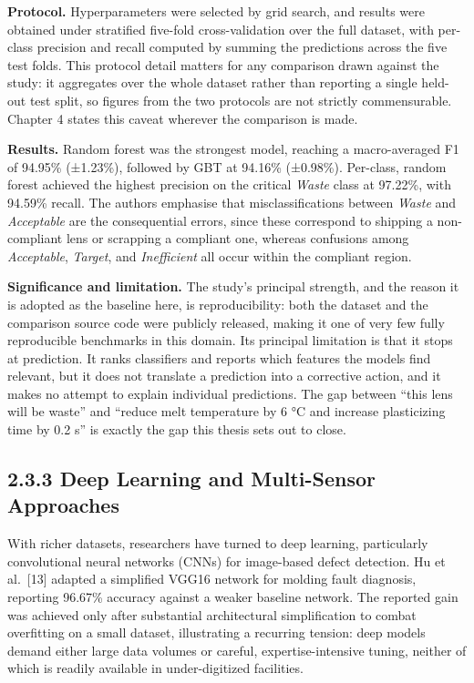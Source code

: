 \textbf{Protocol.} Hyperparameters were selected by grid search, and results were obtained under stratified five-fold cross-validation over the full dataset, with per-class precision and recall computed by summing the predictions across the five test folds. This protocol detail matters for any comparison drawn against the study: it aggregates over the whole dataset rather than reporting a single held-out test split, so figures from the two protocols are not strictly commensurable. Chapter 4 states this caveat wherever the comparison is made.

\textbf{Results.} Random forest was the strongest model, reaching a macro-averaged F1 of 94.95\% (±1.23\%), followed by GBT at 94.16\% (±0.98\%). Per-class, random forest achieved the highest precision on the critical \emph{Waste} class at 97.22\%, with 94.59\% recall. The authors emphasise that misclassifications between \emph{Waste} and \emph{Acceptable} are the consequential errors, since these correspond to shipping a non-compliant lens or scrapping a compliant one, whereas confusions among \emph{Acceptable}, \emph{Target}, and \emph{Inefficient} all occur within the compliant region.

\textbf{Significance and limitation.} The study's principal strength, and the reason it is adopted as the baseline here, is reproducibility: both the dataset and the comparison source code were publicly released, making it one of very few fully reproducible benchmarks in this domain. Its principal limitation is that it stops at prediction. It ranks classifiers and reports which features the models find relevant, but it does not translate a prediction into a corrective action, and it makes no attempt to explain individual predictions. The gap between ``this lens will be waste'' and ``reduce melt temperature by 6 °C and increase plasticizing time by 0.2 s'' is exactly the gap this thesis sets out to close.

\hypertarget{deep-learning-and-multi-sensor-approaches}{%
\subsection{2.3.3 Deep Learning and Multi-Sensor Approaches}\label{deep-learning-and-multi-sensor-approaches}}

With richer datasets, researchers have turned to deep learning, particularly convolutional neural networks (CNNs) for image-based defect detection. Hu et al.~{[}13{]} adapted a simplified VGG16 network for molding fault diagnosis, reporting 96.67\% accuracy against a weaker baseline network. The reported gain was achieved only after substantial architectural simplification to combat overfitting on a small dataset, illustrating a recurring tension: deep models demand either large data volumes or careful, expertise-intensive tuning, neither of which is readily available in under-digitized facilities.


